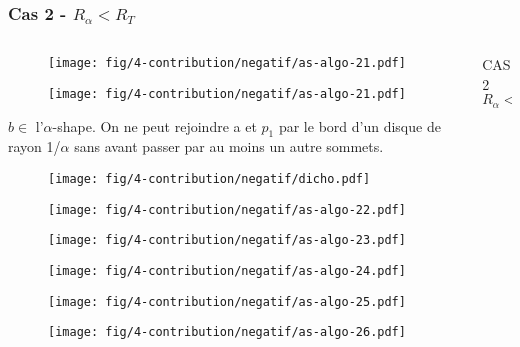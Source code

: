 \begin{frame}
  \frametitle{Cas 2 - $R_{\alpha} < R_T$}
 \begin{columns}[t]
   \begin{column}{7cm}
      {
        \begin{figure}[h!]
          \centering
          \texttt{[image: fig/4-contribution/negatif/as-algo-21.pdf]}
      \end{figure}
      }
      {
        \begin{figure}[h!]
          \centering
          \texttt{[image: fig/4-contribution/negatif/as-algo-21.pdf]}
      \end{figure}
      }
      {
      	\begin{block}{$b \in$ l'$\alpha$-shape.}
          On ne peut rejoindre a et $p_1$ par le bord d'un disque de rayon 1/$\alpha$ sans avant passer par au moins un autre sommets.
          \end{block}
      }         
      {
        \begin{figure}[h!]
          \centering
          \texttt{[image: fig/4-contribution/negatif/dicho.pdf]}
      \end{figure}
      }
      
      {
        \begin{figure}[h!]
          \centering
          \texttt{[image: fig/4-contribution/negatif/as-algo-22.pdf]}
      \end{figure}
      }
      {
        \begin{figure}[h!]
          \centering
          \texttt{[image: fig/4-contribution/negatif/as-algo-23.pdf]}
      \end{figure}
      }
      {
        \begin{figure}[h!]
          \centering
          \texttt{[image: fig/4-contribution/negatif/as-algo-24.pdf]}
      \end{figure}
      }
      {
        \begin{figure}[h!]
          \centering
          \texttt{[image: fig/4-contribution/negatif/as-algo-25.pdf]}
      \end{figure}
      }
      {
        \begin{figure}[h!]
          \centering
          \texttt{[image: fig/4-contribution/negatif/as-algo-26.pdf]}
      \end{figure}
      }
    \end{column}
    \begin{column}{3cm}
      \begin{block}{}
        {
          \alert{CAS 2}\\
          \alert{$R_{\alpha} < R_T$}

}
\end{block}
\end{column}
\end{columns}
\end{frame}
